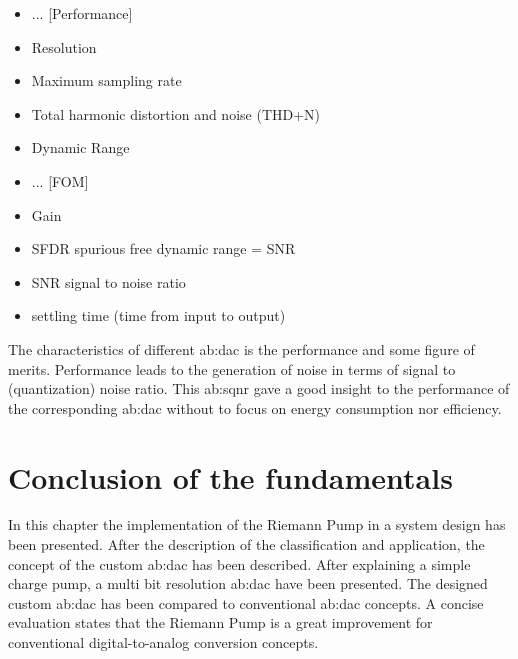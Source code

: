 \begin{itemize}
\item ... [Performance]
	\item Resolution
	\item Maximum sampling rate
	\item Total harmonic distortion and noise (THD+N)
	\item Dynamic Range
	\item ... [FOM]
	\item Gain
	\item SFDR spurious free dynamic range = SNR
	\item SNR signal to noise ratio
	\item settling time (time from input to output)
\end{itemize}
The characteristics of different \gls{ab:dac} is the performance and some figure of merits.
Performance leads to the generation of noise in terms of signal to (quantization) noise ratio.
This \gls{ab:sqnr} gave a good insight to the performance of the corresponding \gls{ab:dac} without to focus on energy consumption nor efficiency.


\section{Conclusion of the fundamentals}
In this chapter the implementation of the Riemann Pump in a system design has been presented.
After the description of the classification and application, the concept of the custom \gls{ab:dac} has been described.
After explaining a simple charge pump, a multi bit resolution \gls{ab:dac} have been presented.
The designed custom \gls{ab:dac} has been compared to conventional \gls{ab:dac} concepts.
A concise evaluation states that the Riemann Pump is a great improvement for conventional digital-to-analog conversion concepts.